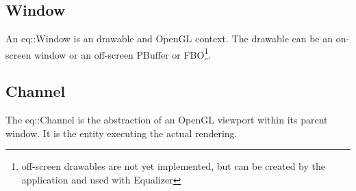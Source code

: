 \documentclass[10pt,a4]{scrartcl}
\begin{document}
\subsection{Window}

An \textsf{eq::Window} is an drawable and OpenGL context. The drawable
can be an on-screen window or an off-screen PBuffer or
FBO\footnote{off-screen drawables are not yet implemented, but can be
  created by the application and used with Equalizer}. 

\subsection{Channel}

The \textsf{eq::Channel} is the abstraction of an OpenGL viewport within
its parent window. It is the entity executing the actual rendering.



\end{document}
